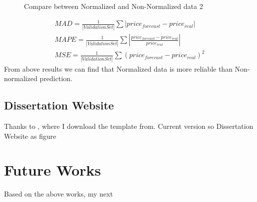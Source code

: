\documentclass[12pt,a4paper]{scrartcl}
\begin{document}
	\begin{figure}[ht]
		\centering
		\caption{Compare between Normalized and Non-Normalized data 2}
		\label{fig:mse_mad}
	\end{figure}
	\begin{gather}
	\label{eq:MAD}
	MAD = \frac{1}{|ValidationSet|}\sum|price_{forecast}-price_{real}|\\
	\label{eq:MAPE}
	MAPE = \frac{1}{|ValidationSet|}\sum|\frac{price_{forecast}-price_{real}}{price_{real}}|\\
	\label{eq:MSE}
	MSE = \frac{1}{|ValidationSet|}\sum(price_{forecast}-price_{real})^2
	\end{gather}
	From above results we can find that Normalized data is more reliable than Non-normalized prediction.
	\subsection{Dissertation Website}
	Thanks to \cite{1_miller_2016}, where I download the template from. Current version so Dissertation Website as figure~
	\section{Future Works}
	Based on the above works, my next
	
\end{document}
